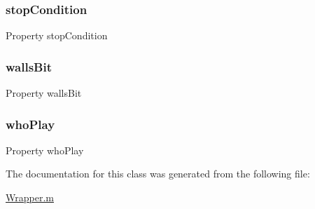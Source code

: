 \mbox{\label{class_wrapper_a19a246dc459b20945f02106d6734fa4b}} 
\subsubsection{\texorpdfstring{stop\+Condition}{stopCondition}}
{\footnotesize\ttfamily Property stop\+Condition}

\mbox{\label{class_wrapper_a94dd71be012b98d496117309a20939b1}} 
\subsubsection{\texorpdfstring{walls\+Bit}{wallsBit}}
{\footnotesize\ttfamily Property walls\+Bit}

\mbox{\label{class_wrapper_a19e8c1d68257003eba8e5a47c8302113}} 
\subsubsection{\texorpdfstring{who\+Play}{whoPlay}}
{\footnotesize\ttfamily Property who\+Play}



The documentation for this class was generated from the following file\+:\begin{DoxyCompactItemize}
\item 
\hyperlink{_wrapper_8m}{Wrapper.\+m}\end{DoxyCompactItemize}
